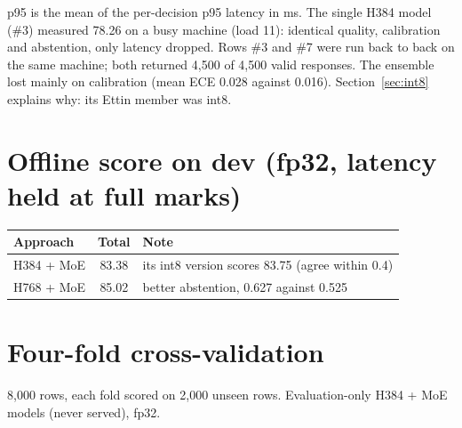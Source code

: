 \documentclass[10pt,a4paper]{article}
\begin{document}
\medskip
\noindent p95 is the mean of the per-decision p95 latency in ms. The single H384 model (\#3)
measured 78.26 on a busy machine (load 11): identical quality, calibration and abstention,
only latency dropped. Rows \#3 and \#7 were run back to back on the same machine; both
returned 4{,}500 of 4{,}500 valid responses. The ensemble lost mainly on calibration
(mean ECE 0.028 against 0.016). Section~\ref{sec:int8} explains why: its Ettin member was int8.

\begin{center}
\end{center}

\section{Offline score on dev (fp32, latency held at full marks)}
\begin{center}
\begin{tabular}{lcl}
\toprule
Approach & Total & Note \\
\midrule
H384 + MoE & 83.38 & its int8 version scores 83.75 (agree within 0.4) \\
H768 + MoE & 85.02 & better abstention, 0.627 against 0.525 \\
\bottomrule
\end{tabular}
\end{center}

\section{Four-fold cross-validation}
8{,}000 rows, each fold scored on 2{,}000 unseen rows. Evaluation-only H384 + MoE models
(never served), fp32.
\end{document}
